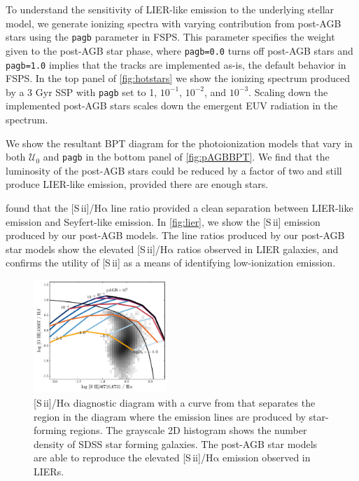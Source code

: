 \documentclass[trackchanges, twocolumn, tighten]{aastex61}
\newcommand{\Fig}[1]{\autoref{fig:#1}}
\newcommand{\FSPS}{{\sc FSPS}\xspace}
\newcommand{\sii}{[S\,{\sc ii}]\xspace}
\newcommand{\ha}{\ensuremath{\mathrm{H\alpha}}}
\newcommand{\U}{\ensuremath{\mathcal{U}_{0}}}
\begin{document}
To understand the sensitivity of LIER-like emission to the underlying stellar model, we generate ionizing spectra with varying contribution from post-AGB stars using the {\tt pagb} parameter in \FSPS. This parameter specifies the weight given to the post-AGB star phase, where {\tt pagb=0.0} turns off post-AGB stars and {\tt pagb=1.0} implies that the \citet{Vassiliadis} tracks are implemented as-is, the default behavior in \FSPS. In the top panel of \Fig{hotstars} we show the ionizing spectrum produced by a 3 Gyr SSP with {\tt pagb} set to 1, $10^{-1}$, $10^{-2}$, and $10^{-3}$. Scaling down the implemented post-AGB stars scales down the emergent EUV radiation in the spectrum.

We show the resultant BPT diagram for the photoionization models that vary in both \U{} and {\tt pagb} in the bottom panel of \Fig{pAGBBPT}. We find that the luminosity of the post-AGB stars could be reduced by a factor of two and still produce LIER-like emission, provided there are enough stars.

\citet{Belfiore16} found that the \sii{}/\ha{} line ratio provided a clean separation between LIER-like emission and Seyfert-like emission. In \Fig{lier}, we show the \sii{} emission produced by our post-AGB models. The line ratios produced by our post-AGB star models show the elevated \sii{}/\ha{} ratios observed in LIER galaxies, and confirms the utility of \sii{} as a means of identifying low-ionization emission.

\begin{figure}
  \begin{centering}
    \includegraphics[width=0.45\textwidth]{f27.pdf}
    \caption{\sii{}/\ha{} diagnostic diagram with a curve from \citet{Kewley01} that separates the region in the diagram where the emission lines are produced by star-forming regions. The grayscale 2D histogram shows the number density of SDSS star forming galaxies. The post-AGB star models are able to reproduce the elevated \sii{}/\ha{} emission observed in LIERs.}
    \label{fig:lier}
  \end{centering}
\end{figure}
\end{document}
